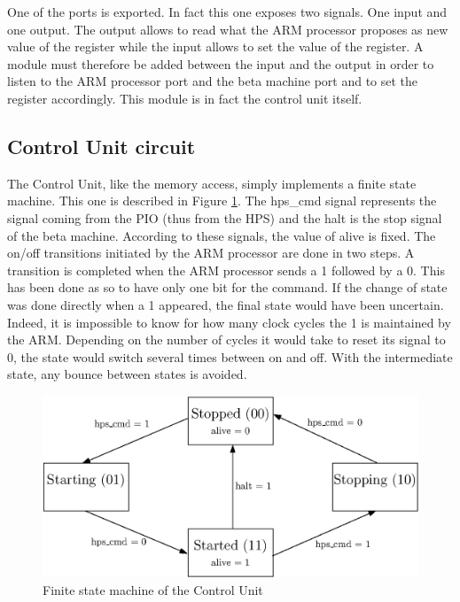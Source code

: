 One of the ports is exported. In fact this one exposes two signals. One input and one output. The 
output allows to read what the ARM processor proposes as new value of the register while the input 
allows to set the value of the register. A module must therefore be added between the input and the 
output in order to listen to the ARM processor port and the beta machine port and to set the 
register accordingly. This module is in fact the control unit itself.

\subsection{Control Unit circuit}

The Control Unit, like the memory access, simply implements a finite state machine. This one is 
described in Figure \ref{fig:ctrlu/fsm}. The hps\_cmd signal represents the signal coming from the 
PIO (thus from the HPS) and the halt is the stop signal of the beta machine. According to these 
signals, the value of alive is fixed. The on/off transitions initiated by the ARM processor are 
done in two steps. A transition is completed when the ARM processor sends a 1 followed by a 0. This 
has been done as so to have only one bit for the command. If the change of state was done directly 
when a 1 appeared, the final state would have been uncertain. Indeed, it is impossible to know for 
how many clock cycles the 1 is maintained by the ARM. Depending on the number of cycles it would 
take to reset its signal to 0, the state would switch several times between on and off. With 
the intermediate state, any bounce between states is avoided.

\begin{figure}[ht!]
    \center
    \includegraphics[scale=0.8]{"Chapter6-MAU_CTRLU/res/ctrlu_fsm"}
    \caption{Finite state machine of the Control Unit}
    \label{fig:ctrlu/fsm}
\end{figure}

